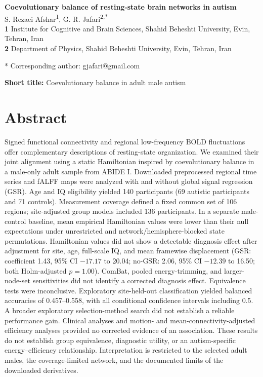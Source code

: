 \documentclass[10pt,letterpaper]{article}
\begin{document}
\vspace*{0.2in}

\begin{flushleft}
{\Large
\textbf{Coevolutionary balance of resting-state brain networks in autism}
}
\newline
\\
S. Rezaei Afshar\textsuperscript{1},
G. R. Jafari\textsuperscript{2,*}
\\
\bigskip
\textbf{1} Institute for Cognitive and Brain Sciences, Shahid Beheshti University, Evin, Tehran, Iran
\\
\textbf{2} Department of Physics, Shahid Beheshti University, Evin, Tehran, Iran
\\
\bigskip

* Corresponding author: gjafari@gmail.com

\medskip
\textbf{Short title:} Coevolutionary balance in adult male autism

\end{flushleft}

\clearpage
{}
\section*{Abstract}
Signed functional connectivity and regional low-frequency BOLD fluctuations offer
complementary descriptions of resting-state organization. We examined their joint
alignment using a static Hamiltonian inspired by coevolutionary balance in a
male-only adult sample from ABIDE I. Downloaded preprocessed regional time series
and fALFF maps were analyzed with and without global signal regression (GSR).
Age and IQ eligibility yielded 140 participants (69 autistic participants and
71 controls). Measurement coverage defined a fixed common set of 106 regions;
site-adjusted group models included 136 participants. In a separate male-control
baseline, mean empirical Hamiltonian values were lower than their null expectations
under unrestricted and network/hemisphere-blocked state permutations. Hamiltonian values did not
show a detectable diagnosis effect after adjustment for site, age, full-scale IQ,
and mean framewise displacement (GSR: coefficient 1.43, 95\% CI $-17.17$ to 20.04;
no-GSR: 2.06, 95\% CI $-12.39$ to 16.50; both Holm-adjusted $p=1.00$).
ComBat, pooled energy-trimming, and larger-node-set sensitivities did not identify
a corrected diagnosis effect. Equivalence tests were inconclusive. Exploratory
site-held-out classification yielded balanced accuracies of 0.457--0.558, with
all conditional confidence intervals including 0.5.
A broader exploratory selection-method search did not establish a reliable performance gain. Clinical analyses and
motion- and mean-connectivity-adjusted efficiency analyses provided no corrected
evidence of an association. These results do not establish group equivalence,
diagnostic utility, or an autism-specific energy--efficiency relationship.
Interpretation is restricted to the selected adult males, the coverage-limited
network, and the documented limits of the downloaded derivatives.
\end{document}
